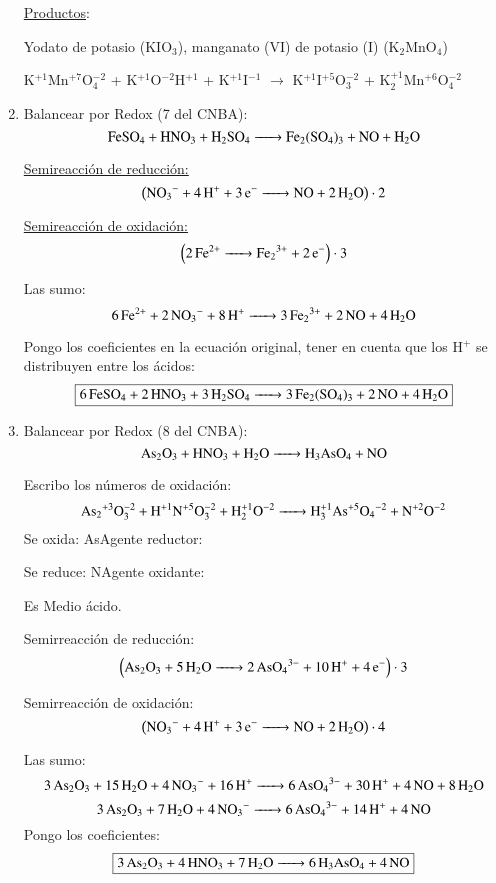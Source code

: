 \begin{enumerate}
\skipline
\underline{Productos}:

Yodato de potasio (KIO$_3$), manganato (VI) de potasio (I) (K$_2$MnO$_4$)

\skipline
{\large
\hfil
K$^{+1}$Mn$^{+7}$O$_4^{-2}$ \hfil+\hfil
K$^{+1}$O$^{-2}$H$^{+1}$ \hfil+\hfil
K$^{+1}$I$^{-1}$ \hfil$\longrightarrow$\hfil
K$^{+1}$I$^{+5}$O$_3^{-2}$ \hfil+\hfil
K$_2^{+1}$Mn$^{+6}$O$_4^{-2}$
\hfil
}


\item Balancear por Redox (7 del CNBA):
$$\ce{FeSO_4 + HNO_3 + H_2SO_4 -> Fe_2(SO4)3 + NO + H2O}$$

\begin{multicols}{2}
\underline{Semireacción de reducción:}
 $$\left(\ce{NO_3^- + 4H^+ + 3e^- -> NO + 2H_2O}\right)\cdot 2$$

\underline{Semireacción de oxidación:}
$$\left(\ce{ 2Fe^{2+} -> Fe_2^{3+} + 2e^-}  \right)\cdot 3$$
\end{multicols}

Las sumo:
$$
\ce{6Fe^{2+} + 2NO_3^- + 8H^+ -> 3Fe_2^{3+} + 2NO + 4H_2O}
$$

Pongo los coeficientes en la ecuación original, tener en cuenta que los H$^+$ se distribuyen entre los ácidos:
$$\fbox{\ce{6FeSO_4 + 2HNO_3 + 3H_2SO_4 -> 3Fe_2(SO4)3 + 2NO + 4H2O}}$$


\newpage
\item Balancear por Redox (8 del CNBA):
$$\ce{
As2O3 + HNO3 + H2O -> H3AsO4 + NO
}$$

Escribo los números de oxidación:
$$\ce{
As2^{+3}O^{-2}3 + H^{+1}N^{+5}O^{-2}3 + H^{+1}2O^{-2} -> H^{+1}3As^{+5}O4^{-2} + N^{+2}O^{-2}
}$$
\hfil Se oxida: As\hfil Agente reductor: \hfil

\hfil Se reduce: N\hfil Agente oxidante: \hfil

Es Medio ácido.

\begin{multicols}{2}
Semirreacción de reducción:
$$\left(\ce{
As2O3 + 5H2O -> 2AsO4^{3-} + 10H^+ +4e^-
}\right)\cdot 3$$

Semirreacción de oxidación:
$$\left(\ce{
NO_3^{-} + 4H^+ +3e^- -> NO + 2H2O
}\right)\cdot 4$$
\end{multicols}

Las sumo:
$$\ce{
3As2O3 + 15H2O + 4NO3^- + 16H^+ -> 6AsO_4^{3-} + 30H^+ + 4NO + 8 H2O
}$$
$$\ce{
3As2O3 + 7H2O + 4NO3^- -> 6AsO_4^{3-} + 14H^+ + 4NO
}$$
Pongo los coeficientes:
$$\fbox{\ce{
3As2O3 + 4HNO3 + 7H2O -> 6H3AsO4 + 4NO}}$$



\end{enumerate}
